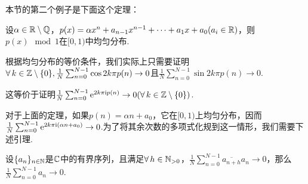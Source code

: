 本节的第二个例子是下面这个定理：
\begin{theorem}
    设$\alpha\in\mathbb{R}\setminus\mathbb{Q}$，$p(x)=\alpha x^n+a_{n-1}x^{n-1}+\cdots+a_1x+a_0(a_i\in\mathbb{R})$，则$p(x)\mod 1$在$[0,1)$中均匀分布.
\end{theorem}
根据均匀分布的等价条件，我们实际上只需要证明$\forall\, k\in\mathbb{Z}\setminus\{0\},\frac{1}{N}\sum_{n=0}^{N-1}{\cos{2k\pi p(n)}}\to 0$且$\frac{1}{N}\sum_{n=0}^{N-1}{\sin{2k\pi p(n)}}\to 0$.\par
这等价于证明$\frac{1}{N}\sum_{n=0}^{N-1}{\mathrm{e}^{2k\pi \mathrm{i} p(n)}}\to 0(\forall\, k\in\mathbb{Z}\setminus\{0\})$.\par
对于上面的定理，如果$p(n)=\alpha n+a_0$，它在$[0,1)$上均匀分布，因而$\frac{1}{N}\sum_{n=0}^{N-1}{\mathrm{e}^{2k\pi \mathrm{i}(\alpha n+a_0)}}\to 0$.为了将其余次数的多项式化规到这一情形，我们需要下述引理.\par
\begin{lemma}
    设$\{a_n\}_{n\in\mathbb{N}}$是$\mathbb{C}$中的有界序列，且满足$\forall\, h\in\mathbb{N}_{>0}$，$\frac{1}{N}\sum_{n=0}^{N-1}{\overline{a_{n+h}}a_n}\to 0$，那么$\frac{1}{N}\sum_{n=0}^{N-1}{a_n}\to 0$.
\end{lemma}
